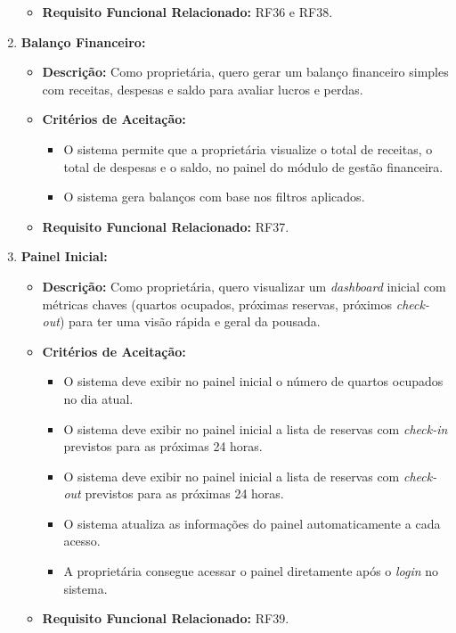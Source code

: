 \documentclass[
	12pt,				%
	openany,			%
	twoside,			%
	a4paper,			%
	english,			%
	french,				%
	spanish,			%
	brazil				%
	]{abntex2}
\begin{document}
\begin{enumerate}[label=\textbf{\arabic*.}]
\begin{itemize}
	 	\item \textbf{Requisito Funcional Relacionado:} RF36 e RF38.
	 \end{itemize} 
	  \item \textbf{Balanço Financeiro:}
	 \begin{itemize}
	 	\item \textbf{Descrição:} Como proprietária, quero gerar um balanço financeiro simples com receitas, despesas e saldo para avaliar lucros e perdas.
	 	\item \textbf{Critérios de Aceitação:}
	 	\begin{itemize}
	 		\item O sistema permite que a proprietária visualize o total de receitas, o total de despesas e o saldo, no painel do módulo de gestão financeira.
	 		\item O sistema gera balanços com base nos filtros aplicados.
	 	\end{itemize}
	 	\item \textbf{Requisito Funcional Relacionado:} RF37.
	 \end{itemize} 
	  \item \textbf{Painel Inicial:}
	 \begin{itemize}
	 	\item \textbf{Descrição:} Como proprietária, quero visualizar um \textit{dashboard} inicial com métricas chaves (quartos ocupados, próximas reservas, próximos \textit{check-out}) para ter uma visão rápida e geral da pousada.
	 	\item \textbf{Critérios de Aceitação:}
	 	\begin{itemize}
	 		\item O sistema deve exibir no painel inicial o número de quartos ocupados no dia atual.
	 		\item O sistema deve exibir no painel inicial a lista de reservas com \textit{check-in} previstos para as próximas 24 horas.
	 		\item O sistema deve exibir no painel inicial a lista de reservas com \textit{check-out} previstos para as próximas 24 horas.
	 		\item O sistema atualiza as informações do painel automaticamente a cada acesso.
	 		\item A proprietária consegue acessar o painel diretamente após o \textit{login} no sistema.
	 	\end{itemize}
	 	\item \textbf{Requisito Funcional Relacionado:} RF39.
	 \end{itemize} 

\end{enumerate}
\end{document}
